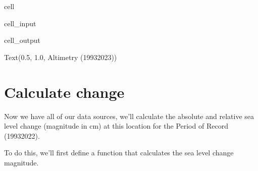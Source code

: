 \documentclass[letterpaper,10pt,english]{jupyterBook}
\begin{document}
\begin{sphinxuseclass}{cell}
\begin{sphinxVerbatimInput}
\begin{sphinxuseclass}{cell_input}
\begin{sphinxVerbatim}[commandchars=\\\{\}]
\PYG{p}{[} \PYG{p}{]}

\end{sphinxVerbatim}

\end{sphinxuseclass}\end{sphinxVerbatimInput}
\begin{sphinxVerbatimOutput}

\begin{sphinxuseclass}{cell_output}
\begin{sphinxVerbatim}[commandchars=\\\{\}]
Text(0.5, 1.0, \PYGZsq{}Altimetry (1993\PYGZhy{}2023)\PYGZsq{})
\end{sphinxVerbatim}

\noindent{}

\end{sphinxuseclass}\end{sphinxVerbatimOutput}

\end{sphinxuseclass}

\chapter{Calculate change}
\label{\detokenize{notebooks/regional_and_local/SL_Trend:calculate-change}}
\sphinxAtStartPar
Now we have all of our data sources, we’ll calculate the absolute and relative sea level change (magnitude in cm) at this location for the Period of Record (1993\sphinxhyphen{}2022).

\sphinxAtStartPar
To do this, we’ll first define a function that calculates the sea level change magnitude.
\end{document}
